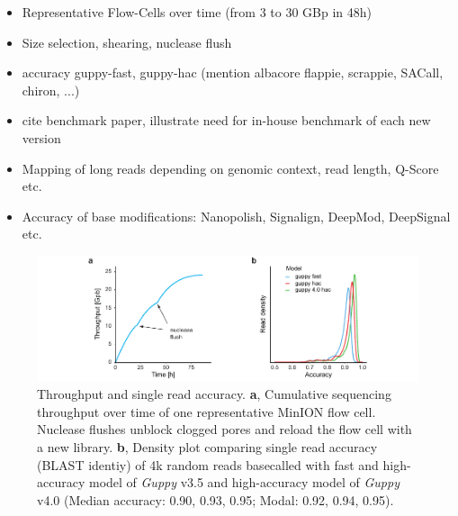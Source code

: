\begin{itemize}
    \item Representative Flow-Cells over time (from 3 to 30 GBp in 48h)
    \item Size selection, shearing, nuclease flush
    \item accuracy guppy-fast, guppy-hac (mention albacore flappie, scrappie, SACall, chiron, ...)
    \item cite benchmark paper, illustrate need for in-house benchmark of each new version
    \item Mapping of long reads depending on genomic context, read length, Q-Score etc.
    \item Accuracy of base modifications: Nanopolish, Signalign, DeepMod, DeepSignal etc.
\end{itemize}

\begin{figure}[h]
    \centering
    \includegraphics[width=1.0\textwidth]{figures/state_of_art/throughput.pdf}
    \captionsetup{format=plain}
    \caption[Throughput and accuracy]{Throughput and single read accuracy. \textbf{a}, Cumulative sequencing throughput over time of one representative MinION flow cell. Nuclease flushes unblock clogged pores and reload the flow cell with a new library. \textbf{b}, Density plot comparing single read accuracy (BLAST identiy) of 4k random reads basecalled with fast and high-accuracy model of \textit{Guppy} v3.5 and high-accuracy model of \textit{Guppy} v4.0 (Median accuracy: 0.90, 0.93, 0.95; Modal: 0.92, 0.94, 0.95).}
    \label{fig:state_of_art:throughput}
\end{figure}

